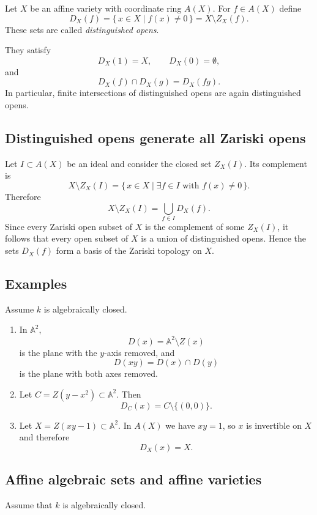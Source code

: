 \documentclass[12pt,a4paper]{article}
\theoremstyle{plain}
\theoremstyle{definition}      %
\begin{document}
Let $X$ be an affine variety with coordinate ring $A(X)$.
For $f\in A(X)$ define
\[
D_X(f)
=
\{\,x\in X\mid f(x)\neq 0\,\}
=
X\setminus Z_X(f).
\]
These sets are called \emph{distinguished opens}.

They satisfy
\[
D_X(1)=X,
\qquad
D_X(0)=\emptyset,
\]
and
\[
D_X(f)\cap D_X(g)=D_X(fg).
\]
In particular, finite intersections of distinguished opens are again distinguished opens.

\subsection*{Distinguished opens generate all Zariski opens}

Let $I\subset A(X)$ be an ideal and consider the closed set $Z_X(I)$.
Its complement is
\[
X\setminus Z_X(I)
=
\{\,x\in X \mid \exists f\in I \text{ with } f(x)\neq 0\,\}.
\]
Therefore
\[
X\setminus Z_X(I)
=
\bigcup_{f\in I} D_X(f).
\]
Since every Zariski open subset of $X$ is the complement of some $Z_X(I)$, it follows that every open subset of $X$ is a union of distinguished opens.
Hence the sets $D_X(f)$ form a basis of the Zariski topology on $X$.

\subsection*{Examples}

Assume $k$ is algebraically closed.

\begin{enumerate}
	\item In $\mathbb A^2$,
	\[
	D(x)
	=
	\mathbb A^2\setminus Z(x)
	\]
	is the plane with the $y$-axis removed, and
	\[
	D(xy)=D(x)\cap D(y)
	\]
	is the plane with both axes removed.
	
	\item Let $C=Z(y-x^2)\subset \mathbb A^2$. Then
	\[
	D_C(x)=C\setminus\{(0,0)\}.
	\]
	
	\item Let $X=Z(xy-1)\subset \mathbb A^2$. In $A(X)$ we have $xy=1$, so $x$ is invertible on $X$ and therefore
	\[
	D_X(x)=X.
	\]
\end{enumerate}

\subsection*{Affine algebraic sets and affine varieties}

Assume that $k$ is algebraically closed.
\end{document}
